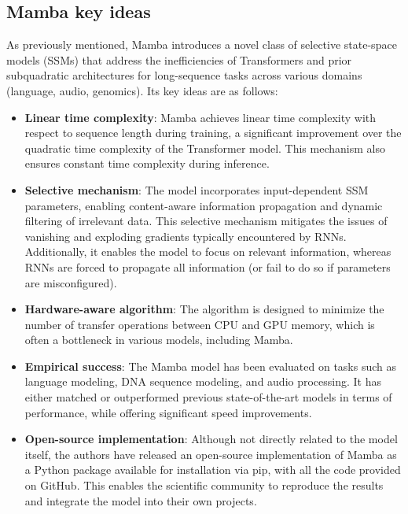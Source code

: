 \documentclass[onecolumn]{IEEEtran}
\begin{document}
\subsection{Mamba key ideas}
As previously mentioned, Mamba introduces a novel class of selective state-space models (SSMs) that address the inefficiencies of Transformers and prior subquadratic architectures for long-sequence tasks across various domains (language, audio, genomics). Its key ideas are as follows:
\begin{itemize}
    \item \textbf{Linear time complexity}: Mamba achieves linear time complexity with respect to sequence length during training, a significant improvement over the quadratic time complexity of the Transformer model. This mechanism also ensures constant time complexity during inference.
    \item \textbf{Selective mechanism}: The model incorporates input-dependent SSM parameters, enabling content-aware information propagation and dynamic filtering of irrelevant data. This selective mechanism mitigates the issues of vanishing and exploding gradients typically encountered by RNNs. Additionally, it enables the model to focus on relevant information, whereas RNNs are forced to propagate all information (or fail to do so if parameters are misconfigured).
    \item \textbf{Hardware-aware algorithm}: The algorithm is designed to minimize the number of transfer operations between CPU and GPU memory, which is often a bottleneck in various models, including Mamba.
    \item \textbf{Empirical success}: The Mamba model has been evaluated on tasks such as language modeling, DNA sequence modeling, and audio processing. It has either matched or outperformed previous state-of-the-art models in terms of performance, while offering significant speed improvements.
    \item \textbf{Open-source implementation}: Although not directly related to the model itself, the authors have released an open-source implementation of Mamba as a Python package available for installation via pip, with all the code provided on GitHub. This enables the scientific community to reproduce the results and integrate the model into their own projects.
\end{itemize}
\end{document}
